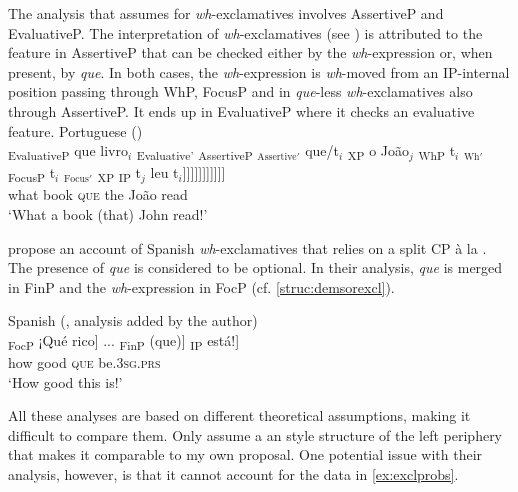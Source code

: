 The analysis that \citet{Ambar2003} assumes for \textit{wh}-exclamatives involves AssertiveP and EvaluativeP.  The  interpretation of \textit{wh}-exclamatives (see ) is  attributed to the feature in AssertiveP that can be checked either by the \textit{wh}-ex\-pres\-sion or, when present, by \emph{que}. In both cases, the \textit{wh}-ex\-pres\-sion is \textit{wh}-moved from an IP-internal position passing through WhP, FocusP and in \emph{que}-less \textit{wh}-exclamatives also through AssertiveP. It ends up in EvaluativeP where it checks an evaluative feature.
\ea Portuguese (\citealt[238--239: ex 88--89]{Ambar2003})\\ 
\gll  {\ob}\textsubscript{EvaluativeP} que livro$_i$ {\ob}\textsubscript{Evaluative'} {\ob}\textsubscript{AssertiveP} {\ob}$_{\text{Assertive}'}$ que/t$_i$ {\ob}\textsubscript{XP} o João$_j$ {\ob}\textsubscript{WhP} t$_i$ {\ob}$_{\text{Wh}'}$ {\ob}\textsubscript{FocusP} t$_i$ {\ob}$_{\text{Focus}'}$ {\ob}\textsubscript{XP} {\ob}\textsubscript{IP} t$_j$ leu t$_i$]]]]]]]]]]] \\
{} what book {} {} {} \textsc{que} {} the João {} {} {} {} {} {} {} {} {} read\\ 
\glt `What a book (that) John read!' 
\z 

\citet{DemonteSoriano2009} propose an account of Spanish \textit{wh}-ex\-clam\-a\-tives that relies on a split CP à la \citet{Rizzi1997}. The presence of \emph{que} is considered to be optional. In their analysis, \emph{que} is merged  in {FinP} and the \textit{wh}-expression in  FocP (cf. \ref{struc:demsorexcl}). 


\ea\label{struc:demsorexcl}
		Spanish (\citealt[33 : ex 19a]{DemonteSoriano2009}, analysis added by the author)\\
\gll  {\ob}\textsubscript{FocP} ¡Qué rico] ... {\ob}\textsubscript{FinP} (que)] {\ob}\textsubscript{IP} está!] \\
{} how good {} {} \textsc{que} {}  be.\textsc{3sg.prs}\\
\glt `How good this is!' 
\z


All these analyses are based on different theoretical assumptions, making it difficult to compare them.  Only \citet{DemonteSoriano2009} assume a \citeauthor{Rizzi1997}an style structure of the left periphery that makes it comparable to my own proposal.  
One potential issue with their analysis,  however, is that it cannot account for the data in \eqref{ex:exclprobs}.

